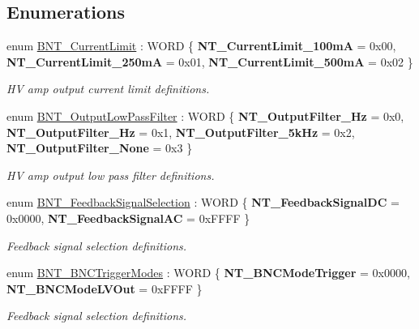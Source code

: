 \subsection*{Enumerations}
\begin{DoxyCompactItemize}
\item 
enum \hyperlink{group___benchtop_nano_trak_ga7749f98a6108f8dec37d05130cfdd1d3}{B\+N\+T\+\_\+\+Current\+Limit} \+: W\+O\+RD \{ {\bfseries N\+T\+\_\+\+Current\+Limit\+\_\+100mA} = 0x00, 
{\bfseries N\+T\+\_\+\+Current\+Limit\+\_\+250mA} = 0x01, 
{\bfseries N\+T\+\_\+\+Current\+Limit\+\_\+500mA} = 0x02
 \}\begin{DoxyCompactList}\small\item\em HV amp output current limit definitions. \end{DoxyCompactList}
\item 
enum \hyperlink{group___benchtop_nano_trak_ga656843cc1b280c9864ca3147a02a02f8}{B\+N\+T\+\_\+\+Output\+Low\+Pass\+Filter} \+: W\+O\+RD \{ {\bfseries N\+T\+\_\+\+Output\+Filter\+\_\+Hz} = 0x0, 
{\bfseries N\+T\+\_\+\+Output\+Filter\+\_\+Hz} = 0x1, 
{\bfseries N\+T\+\_\+\+Output\+Filter\+\_\+5k\+Hz} = 0x2, 
{\bfseries N\+T\+\_\+\+Output\+Filter\+\_\+\+None} = 0x3
 \}\begin{DoxyCompactList}\small\item\em HV amp output low pass filter definitions. \end{DoxyCompactList}
\item 
enum \hyperlink{group___benchtop_nano_trak_ga19553dc0b7ed1b4f7d24cf074673b78e}{B\+N\+T\+\_\+\+Feedback\+Signal\+Selection} \+: W\+O\+RD \{ {\bfseries N\+T\+\_\+\+Feedback\+Signal\+DC} = 0x0000, 
{\bfseries N\+T\+\_\+\+Feedback\+Signal\+AC} = 0x\+F\+F\+FF
 \}\begin{DoxyCompactList}\small\item\em Feedback signal selection definitions. \end{DoxyCompactList}
\item 
enum \hyperlink{group___benchtop_nano_trak_gafcd5eb62b69ae1842a900947e0d1aac3}{B\+N\+T\+\_\+\+B\+N\+C\+Trigger\+Modes} \+: W\+O\+RD \{ {\bfseries N\+T\+\_\+\+B\+N\+C\+Mode\+Trigger} = 0x0000, 
{\bfseries N\+T\+\_\+\+B\+N\+C\+Mode\+L\+V\+Out} = 0x\+F\+F\+FF
 \}\begin{DoxyCompactList}\small\item\em Feedback signal selection definitions. \end{DoxyCompactList}
\end{DoxyCompactItemize}
